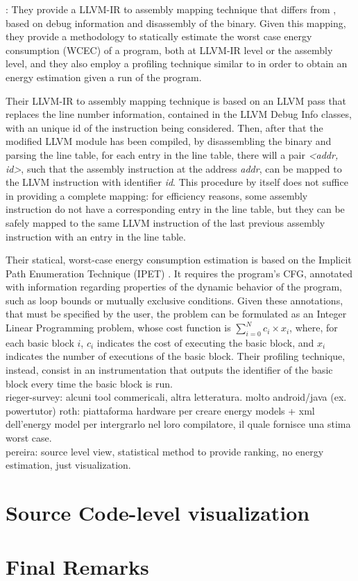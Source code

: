 \cite{eder}: They provide a LLVM-IR to assembly mapping technique that differs from \cite{brando2011}, based on debug information and disassembly of the binary. Given this mapping, they provide a methodology to statically estimate the worst case energy consumption (WCEC) of a program, both at LLVM-IR level or the assembly level, and they also employ a profiling technique similar to \cite{brando2011} in order to obtain an energy estimation given a run of the program. \par 
Their LLVM-IR to assembly mapping technique is based on an LLVM pass that replaces the line number information, contained in the LLVM Debug Info classes, with an unique id of the instruction being considered. Then, after that the modified LLVM module has been compiled, by disassembling the binary and parsing the line table, for each entry in the line table, there will a pair \emph{<addr, id>}, such that the assembly instruction at the address \emph{addr}, can be mapped to the LLVM instruction with identifier \emph{id}.
\newline This procedure by itself does not suffice in providing a complete mapping: for efficiency reasons, some assembly instruction do not have a corresponding entry in the line table, but they can be safely mapped to the same LLVM instruction of the last previous assembly instruction with an entry in the line table. \par 
Their statical, worst-case energy consumption estimation is based on the Implicit Path Enumeration Technique (IPET) \cite{ipet}. It requires the program's CFG, annotated with information regarding properties of the dynamic behavior of the program, such as loop bounds or mutually exclusive conditions.
Given these annotations, that must be specified by the user, the problem can be formulated as an Integer Linear Programming problem, whose cost function is $\sum_{i=0}^{N} c_{i} \times x_{i}$, where, for each basic block $i$, $c_{i}$ indicates the cost of executing the basic block, and $x_{i}$ indicates the number of executions of the basic block. 
Their profiling technique, instead, consist in an instrumentation that outputs the identifier of the basic block every time the basic block is run. \\[1in]


rieger-survey: alcuni tool commericali, altra letteratura. molto android/java (ex. powertutor)
roth: piattaforma hardware per creare energy models + xml dell'energy model per intergrarlo nel loro compilatore, il quale fornisce una stima worst case. \\
pereira: source level view, statistical method to provide ranking, no energy estimation, just visualization. \\

\section{Source Code-level visualization}
\section{Final Remarks}
